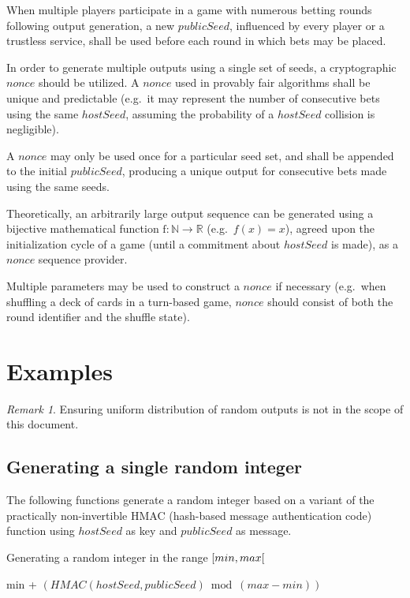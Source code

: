 \documentclass[a4paper]{article}
\theoremstyle{definition}
\theoremstyle{remark}
\newtheorem*{remark*}{Remark}
\begin{document}
When multiple players participate in a game with numerous betting rounds following output generation, a new \(publicSeed\), influenced by every player or a trustless service, shall be used before each round in which bets may be placed.

In order to generate multiple outputs using a single set of seeds, a cryptographic \(nonce\) \cite[pp.~397--398]{menezes1996} should be utilized. A \(nonce\) used in provably fair algorithms shall be unique and predictable (e.g.\ it may represent the number of consecutive bets using the same \(hostSeed\), assuming the probability of a \(hostSeed\) collision is negligible).

A \(nonce\) may only be used once for a particular seed set, and shall be appended to the initial \(publicSeed\), producing a unique output for consecutive bets made using the same seeds.

Theoretically, an arbitrarily large output sequence can be generated using a bijective mathematical function \(\textrm{f}: \mathbb{N} \rightarrow \mathbb{R}\) (e.g.\ \(f(x) = x\)), agreed upon the initialization cycle of a game (until a commitment about \(hostSeed\) is made), as a \(nonce\) sequence provider.

Multiple parameters may be used to construct a \(nonce\) if necessary (e.g.\ when shuffling a deck of cards in a turn-based game, \(nonce\) should consist of both the round identifier and the shuffle state).

\section{Examples}
\begin{remark*}
Ensuring uniform distribution of random outputs is not in the scope of this document.
\end{remark*}

\subsection{Generating a single random integer}
The following functions generate a random integer based on a variant of the practically non-invertible HMAC (hash-based message authentication code) \cite{rfc2104} function using \(hostSeed\) as key and \(publicSeed\) as message.

\begin{algorithm}[H]
\caption{Generating a random integer in the range \(\interval[open right]{min}{max}\)}
\begin{algorithmic}
	\State \Return min + \((HMAC(hostSeed, publicSeed) \bmod (max - min))\)
\EndFunction
\end{algorithmic}
\end{algorithm}
\end{document}
